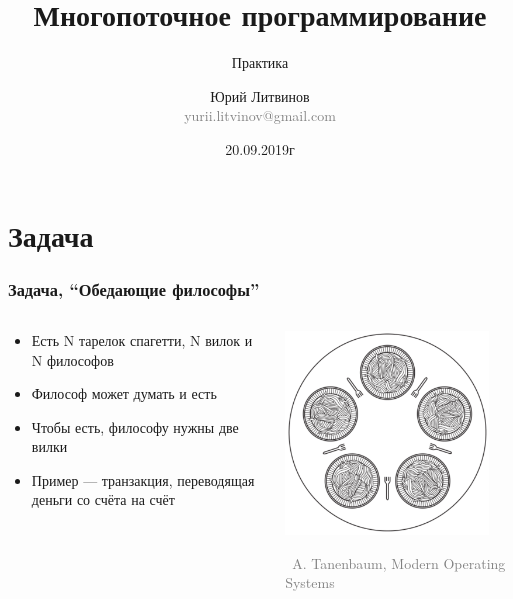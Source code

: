 \documentclass[xetex,mathserif,serif]{beamer}
\title{Многопоточное программирование}
\subtitle{Практика}
\author[Юрий Литвинов]{Юрий Литвинов\\\small{\textcolor{gray}{yurii.litvinov@gmail.com}}}
\date{20.09.2019г}
\newcommand{\attribution}[1] {
\vspace{-2mm}\begin{flushright}\begin{scriptsize}\textcolor{gray}{\textcopyright\, #1}\end{scriptsize}\end{flushright}
}
\begin{document}
	\frame{\titlepage}

	\section{Задача}

	\begin{frame}
		\frametitle{Задача, ``Обедающие философы''}
		\begin{columns}
			\begin{column}{0.5\textwidth}
				\begin{itemize}
					\item Есть N тарелок спагетти, N вилок и N философов
					\item Философ может думать и есть
					\item Чтобы есть, философу нужны две вилки
					\item Пример --- транзакция, переводящая деньги со счёта на счёт
				\end{itemize}
			\end{column}
			\begin{column}{0.5\textwidth}
				\includegraphics[width=0.9\textwidth]{diningPhilosophers.png}
				\attribution{A. Tanenbaum, Modern Operating Systems}
			\end{column}
		\end{columns}
	\end{frame}
\end{document}
